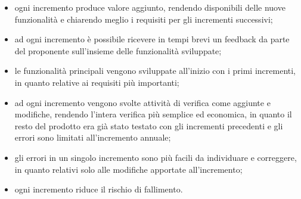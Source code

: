 \begin{itemize}
	\item ogni incremento produce valore aggiunto, rendendo disponibili delle nuove funzionalità e chiarendo meglio i requisiti per gli incrementi successivi;
	\item ad ogni incremento è possibile ricevere in tempi brevi un feedback da parte del proponente sull'insieme delle funzionalità sviluppate;
	\item le funzionalità principali vengono sviluppate all'inizio con i primi incrementi, in quanto relative ai requisiti più importanti;
	\item ad ogni incremento vengono svolte attività di verifica come aggiunte e modifiche, rendendo l'intera verifica più semplice ed economica, in quanto il resto del prodotto era già stato testato con gli incrementi precedenti e gli errori sono limitati all'incremento annuale;
	\item gli errori in un singolo incremento sono più facili da individuare e correggere, in quanto relativi solo alle modifiche apportate all'incremento;
	\item ogni incremento riduce il rischio di fallimento.
\end{itemize}